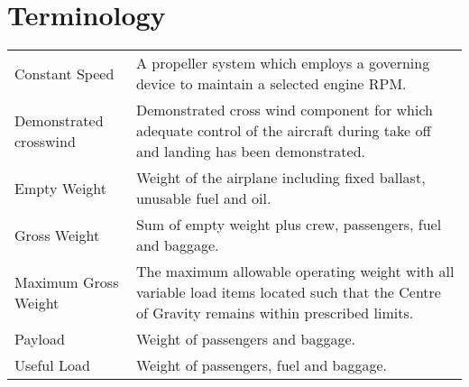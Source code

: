 \section{Terminology}
  \begin{tabularx}{\linewidth}{
    >{\hsize=0.2\hsize}X
    >{\hsize=0.8\hsize}X  }
Constant Speed & A propeller system which employs a governing device to maintain a selected engine RPM.\\
Demonstrated crosswind & Demonstrated cross wind component for which adequate control of the aircraft during take off and landing has been demonstrated.\\
Empty Weight & Weight of the airplane including fixed ballast, unusable fuel and oil.\\
Gross Weight & Sum of empty weight plus crew, passengers, fuel and baggage.  \\
Maximum Gross Weight & The maximum allowable operating weight with all variable load items located such that the Centre of Gravity remains within prescribed limits.\\
Payload & Weight of passengers and baggage.\\
Useful Load & Weight of passengers, fuel and baggage.\\
\end{tabularx}

